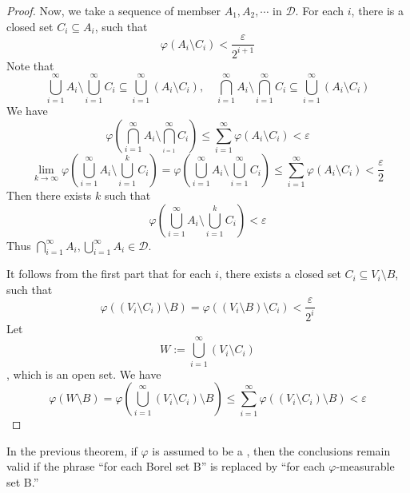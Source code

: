 \documentclass[../main.tex]{subfiles}
\begin{document}
\begin{proof}
    Now, we take a sequence of membser \(  A_1,A_2,\cdots   \)  in \(  \mathcal{D}  \). For each \(  i  \), there is a closed set \(  C_{i}\subseteq A_{i}  \), such that \[
     \varphi \left( A_{i}\setminus C_{i} \right)< \frac{ \varepsilon  }{2^{i+ 1} }  
    \]  Note that \[
    \bigcup _{i= 1}^{\infty}A_{i}\setminus \bigcup _{i= 1}^{\infty}C_{i}\subseteq \bigcup _{i= 1}^{\infty}\left( A_{i}\setminus C_{i} \right),\quad \bigcap_{i= 1}^{\infty}A_{i}\setminus \bigcap_{i= 1}^{\infty}C_{i}\subseteq \bigcup _{i= 1}^{\infty}\left( A_{i}\setminus C_{i} \right)    
    \]We have \[
     \varphi \left( \bigcap_{i= 1}^{\infty}A_{i}\setminus \bigcap_{_{i= 1}}^{\infty}C_{i}   \right)\le \sum _{i= 1}^{\infty} \varphi \left( A_{i}\setminus C_{i} \right)<  \varepsilon   
    \] \[
    \lim_{k\to \infty} \varphi \left( \bigcup _{i= 1}^{\infty}A_{i}\setminus \bigcup _{i= 1}^{k}C_{i}  \right)=  \varphi \left( \bigcup _{i= 1}^{\infty}A_{i}\setminus \bigcup _{i= 1}^{\infty}C_{i} \right)\le \sum _{i= 1}^{\infty} \varphi \left( A_{i}\setminus C_{i} \right)< \frac{ \varepsilon  }{2 }    
    \] Then there exists \(  k  \) such that \[
     \varphi \left( \bigcup _{i= 1}^{\infty}A_{i}\setminus \bigcup _{i= 1}^{k}C_{i} \right)<  \varepsilon  
    \] Thus \(  \bigcap_{i= 1}^{\infty}A_{i},\bigcup _{i= 1}^{\infty}A_{i} \in \mathcal{D}   \). 

    It follows from the first part that for each \(  i  \), there exists a closed set \(  C_{i}  \subseteq V_{i}\setminus B\), such that \[
     \varphi \left( \left( V_{i}\setminus C_{i} \right)\setminus B  \right)=  \varphi \left( \left( V_{i}\setminus B \right)\setminus C_{i}  \right)< \frac{ \varepsilon  }{2^{i} }   
    \]  Let \[
    W:=  \bigcup _{i= 1}^{\infty}\left( V_{i}\setminus C_{i} \right)
    \], which is an open set. We have \[
     \varphi \left( W\setminus B \right)=  \varphi \left( \bigcup _{i= 1}^{\infty}\left( V_{i}\setminus C_{i} \right)\setminus B  \right)  \le \sum _{i= 1}^{\infty} \varphi \left( \left( V_{i} \setminus C_{i}\right)\setminus B  \right) <  \varepsilon 
    \]
\end{proof}

\begin{corollary}{}{}
In the previous theorem, if $\varphi$ is assumed to be a , then the conclusions remain valid if the phrase “for each Borel set B” is replaced by “for each $\varphi$-measurable set B.”
\end{corollary}
\end{document}
